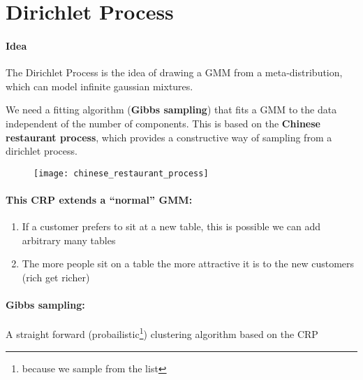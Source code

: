 
\section* {Dirichlet Process}

\paragraph{Idea}

The Dirichlet Process is the idea of drawing a GMM from a meta-distribution, which can model infinite gaussian mixtures.

 We need a fitting algorithm (\textbf{Gibbs sampling}) that fits a GMM to the data independent of the number of components. This is based on the \textbf{Chinese restaurant process}, which provides a constructive way of sampling from a dirichlet process.

\begin{figure}[H]
	\centering
	\texttt{[image: chinese\_restaurant\_process]}
\end{figure}

\paragraph{This CRP extends a ``normal'' GMM:}
\begin{enumerate}
	\item If a customer prefers to sit at a new table, this is possible we can add arbitrary many tables
	\item The more people sit on a table  the more attractive it is to the new customers (rich get richer)
\end{enumerate}

\paragraph{Gibbs sampling:}
A straight forward (probailistic\footnote{because we sample from the list}) clustering algorithm based on the CRP

